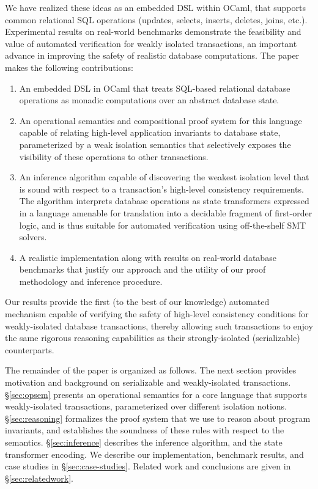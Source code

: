 We have realized these ideas as an embedded DSL within OCaml, that
supports common relational SQL operations (updates, selects, inserts,
deletes, joins, etc.).  Experimental results on real-world benchmarks
demonstrate the feasibility and value of automated verification for
weakly isolated transactions, an important advance in improving the
safety of realistic database computations. The paper makes the
following contributions:
\vspace*{-6pt}
\begin{enumerate}
\item An embedded DSL in OCaml that treats SQL-based relational
  database operations as monadic computations over an abstract
  database state.
 \item An operational semantics and compositional proof system for
   this language capable of relating high-level application invariants
   to database state, parameterized by a weak isolation semantics that
   selectively exposes the visibility of these operations to other
   transactions.
 \item An inference algorithm capable of discovering the weakest
   isolation level that is sound with respect to a transaction's
   high-level consistency requirements.  The algorithm interprets
   database operations as state transformers expressed in a language
   amenable for translation into a decidable fragment of first-order
   logic, and is thus suitable for automated verification using
   off-the-shelf SMT solvers.
 \item A realistic implementation along with results on real-world
   database benchmarks that justify our approach and the utility of
   our proof methodology and inference procedure.
\end{enumerate}
\noindent Our results provide the first (to the best of our knowledge)
automated mechanism capable of verifying the safety of high-level
consistency conditions for weakly-isolated database transactions,
thereby allowing such transactions to enjoy the same rigorous
reasoning capabilities as their strongly-isolated (serializable)
counterparts.

The remainder of the paper is organized as follows. The next section
provides motivation and background on serializable and weakly-isolated
transactions. \S\ref{sec:opsem} presents an operational semantics for
a core language that supports weakly-isolated transactions,
parameterized over different isolation notions. \S\ref{sec:reasoning}
formalizes the proof system that we use to reason about program
invariants, and establishes the soundness of these rules with respect
to the semantics. \S\ref{sec:inference} describes the inference
algorithm, and the state transformer encoding.  We describe our
implementation, benchmark results, and case studies in
\S\ref{sec:case-studies}.  Related work and conclusions are given in
\S\ref{sec:relatedwork}.
